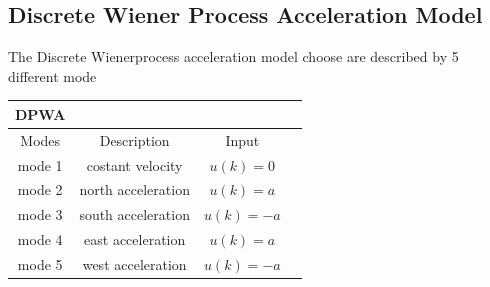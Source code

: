 \documentclass[twocolumn]{article}
\begin{document}
    \subsection*{ Discrete Wiener Process Acceleration Model}
    The Discrete Wienerprocess acceleration model choose are described by 5 different mode
    \\
    \begin{center}
    \begin{tabular}{||c||c |c |c| |}%
        \hline
         DPWA  \\
        \hline\hline
         Modes & Description & Input \\ [0.5ex]
        \hline\hline
        mode 1 & costant velocity      & $u(k)=0$    \\
        \hline
        mode 2  & north acceleration      & $u(k)=a $  \\
        \hline
        mode 3  & south acceleration    & $u(k)=-a $   \\
        \hline
        mode 4  & east acceleration    & $u(k)=a $    \\
        \hline
        mode 5  & west acceleration     & $u(k)=-a $   \\ [1ex]
        \hline
    \end{tabular}
\end{center}
\end{document}
